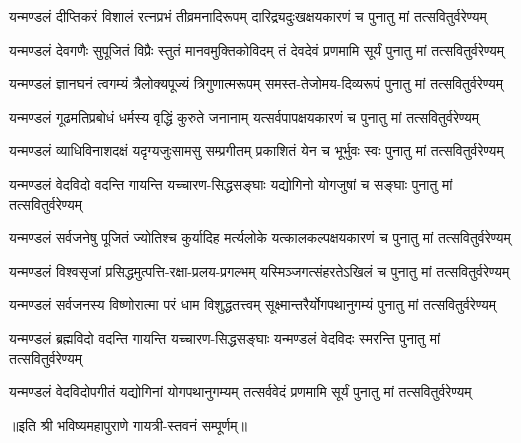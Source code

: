
\twolineshloka
{यन्मण्डलं दीप्तिकरं विशालं रत्नप्रभं तीव्रमनादिरूपम्}
{दारिद्र्यदुःखक्षयकारणं च पुनातु मां तत्सवितुर्वरेण्यम्}

\twolineshloka
{यन्मण्डलं देवगणैः सुपूजितं   विप्रैः स्तुतं मानवमुक्तिकोविदम्}
{तं देवदेवं प्रणमामि सूर्यं   पुनातु मां तत्सवितुर्वरेण्यम्}

\twolineshloka
{यन्मण्डलं ज्ञानघनं त्वगम्यं   त्रैलोक्यपूज्यं त्रिगुणात्मरूपम्}
{समस्त-तेजोमय-दिव्यरूपं   पुनातु मां तत्सवितुर्वरेण्यम्}

\twolineshloka
{यन्मण्डलं गूढमतिप्रबोधं   धर्मस्य वृद्धिं कुरुते जनानाम्}
{यत्सर्वपापक्षयकारणं च   पुनातु मां तत्सवितुर्वरेण्यम्}

\twolineshloka
{यन्मण्डलं व्याधिविनाशदक्षं   यदृग्यजुःसामसु सम्प्रगीतम् }
{प्रकाशितं येन च भूर्भुवः स्वः   पुनातु मां तत्सवितुर्वरेण्यम्}

\twolineshloka
{यन्मण्डलं वेदविदो वदन्ति   गायन्ति यच्चारण-सिद्धसङ्घाः}
{यद्योगिनो योगजुषां च सङ्घाः   पुनातु मां तत्सवितुर्वरेण्यम्}

\twolineshloka
{यन्मण्डलं सर्वजनेषु पूजितं   ज्योतिश्च कुर्यादिह मर्त्यलोके}
{यत्कालकल्पक्षयकारणं च   पुनातु मां तत्सवितुर्वरेण्यम्}

\twolineshloka
{यन्मण्डलं विश्वसृजां प्रसिद्धमुत्पत्ति-रक्षा-प्रलय-प्रगल्भम्}
{यस्मिञ्जगत्संहरतेऽखिलं च   पुनातु मां तत्सवितुर्वरेण्यम् }

\twolineshloka
{यन्मण्डलं सर्वजनस्य विष्णोरात्मा   परं धाम विशुद्धतत्त्वम्}
{सूक्ष्मान्तरैर्योगपथानुगम्यं   पुनातु मां तत्सवितुर्वरेण्यम्}

\twolineshloka
{यन्मण्डलं ब्रह्मविदो वदन्ति   गायन्ति यच्चारण-सिद्धसङ्घाः}
{यन्मण्डलं वेदविदः स्मरन्ति   पुनातु मां तत्सवितुर्वरेण्यम्}

\twolineshloka
{यन्मण्डलं वेदविदोपगीतं   यद्योगिनां योगपथानुगम्यम्}
{तत्सर्ववेदं प्रणमामि सूर्यं   पुनातु मां तत्सवितुर्वरेण्यम्}

॥इति श्री भविष्यमहापुराणे गायत्री-स्तवनं सम्पूर्णम्॥